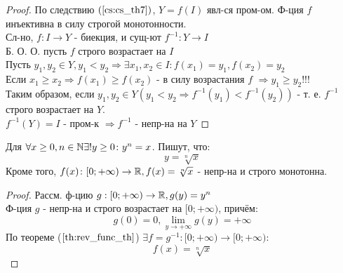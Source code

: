 \begin{proof}
По следствию $(\ref{cs:cs_th7})$,  $Y = f(I)$ явл-ся пром-ом. Ф-ция $f$ инъективна в силу строгой монотонности. \\

Сл-но, $f: I \rightarrow Y$ - биекция, и сущ-ют $f^{-1}: Y \rightarrow I$ \\

Б. О. О. пусть $f$ строго возрастает на $I$ \\

Пусть $y_1, y_2 \in Y, y_1 < y_2 \Rightarrow \exists x_1, x_2 \in I \colon f(x_1) = y_1, f(x_2) = y_2$ \\

Если $x_1 \geq x_2 \Rightarrow f(x_1) \geq f(x_2)$ - в силу возрастания $f$ $\Rightarrow y_1 \geq y_2!!!$ \\

Таким образом, если $y_1, y_2 \in Y (y_1 < y_2 \Rightarrow f^{-1}(y_1) < f^{-1}(y_2))$ - т. е. $f^{-1}$ строго возрастает на $Y$. \\

$f^{-1}(Y) = I$ - пром-к $\Rightarrow f^{-1}$ - непр-на на $Y$
\end{proof}
\begin{example}
Для $\forall x \geq 0, n \in \mathbb{N} \exists! y \geq 0 \colon y^{n} = x$. Пишут, что:
\[
  y = \sqrt[n]{x}
\]
Кроме того, $f(x)\colon [0; +\infty) \rightarrow \mathbb{R}, f(x) = \sqrt[n]{x}$ - непр-на и строго монотонна. 
\end{example}
\begin{proof}
Рассм. ф-цию $g: [0; +\infty) \rightarrow \mathbb{R}, g(y) = y^{n}$ \\

Ф-ция $g$ - непр-на и строго возрастает на $[0; +\infty)$, причём:
\[
  g(0) = 0, \lim_{y\to +\infty} g(y) = +\infty
\]
По теореме ($\ref{th:rev_func_th}$) $\exists f = g^{-1} \colon [0; +\infty) \rightarrow [0; +\infty)$:
\[
  f(x) = \sqrt[n]{x}
\]
\end{proof}
